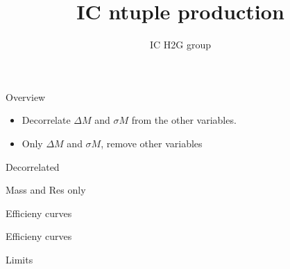 \documentclass[t]{beamer}
\author{IC H2G group}
\title[IC ntuple production]{IC ntuple production}
\begin{document}


\begin{frame}{Overview}
  \begin{itemize}  
   \item Decorrelate $\Delta M$ and $\sigma M$ from the other variables.
   \item Only $\Delta M$ and $\sigma M$, remove other variables  
   \end{itemize}
\end{frame}


\begin{frame}{Decorrelated}
  \begin{center}
  \end{center}
\end{frame}

\begin{frame}{Mass and Res only}
  \begin{center}
  \end{center}
\end{frame}

\begin{frame}{Efficieny curves}
  \begin{center}
  \end{center}
\end{frame}

\begin{frame}{Efficieny curves}
  \begin{center}
  \end{center}
\end{frame}

\begin{frame}{Limits}
  \begin{center}
  \end{center}
\end{frame}
\end{document}
